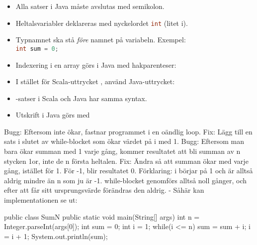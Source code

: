 \begin{itemize}[noitemsep, nolistsep]
\item Alla satser i Java måste avslutas med semikolon.
\item Heltalsvariabler deklareras med nyckelordet \lstinline[language=Java]{int} (litet i).
\item Typnamnet ska stå \emph{före} namnet på variabeln. Exempel: \\ \lstinline[language=Java]{int sum = 0;}
\item Indexering i en array görs i Java med hakparenteser: 
\item I stället för Scala-uttrycket , använd Java-uttrycket: \\ 
\item {}-satser i Scala och Java har samma syntax.
\item Utskrift i Java görs med 
\end{itemize}


\SOLUTION


\TaskSolved \what
 

\SubtaskSolved  Bugg: Eftersom  inte ökar, fastnar programmet i en oändlig loop. Fix: Lägg till en sats i slutet av while-blocket som ökar värdet på i med 1.
Bugg: Eftersom man bara ökar summan med 1 varje gång, kommer resultatet att bli summan av n stycken 1or, inte de n första heltalen. Fix: Ändra så att summan ökar med  varje gång, istället för 1.
För -1, blir resultatet 0. Förklaring: i börjar på 1 och är alltså aldrig mindre än n som ju är -1. while-blocket genomförs alltså noll gånger, och efter att  får sitt ursprungsvärde förändras den aldrig.
\SubtaskSolved  -
\SubtaskSolved  Såhär kan implementationen se ut:
\begin{Code}
public class SumN {
  public static void main(String[] args) {
    int n = Integer.parseInt(args[0]);
    int sum = 0;
    int i = 1;
    while(i <= n){
      sum = sum + i;
      i = i + 1;
      }
    }
    System.out.println(sum);
}
\end{Code}



\QUESTEND









